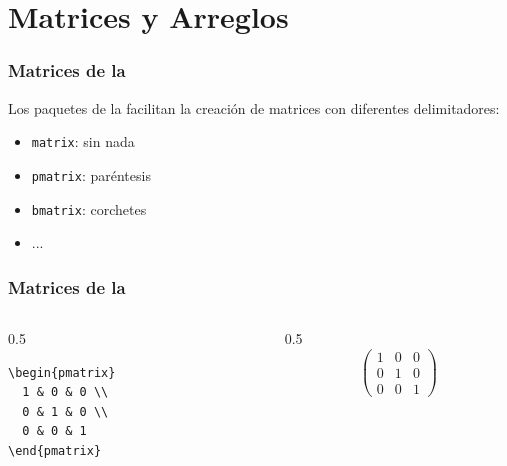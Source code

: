 \documentclass[12pt,aspectratio=169,ignorenonframetext]{ltxbeamer}
\begin{document}
\section{Matrices y Arreglos}

\begin{frame}
\frametitle{Matrices de la }

Los paquetes de la  facilitan la creación de matrices con diferentes delimitadores:
\begin{itemize}
    \item \texttt{matrix}: sin nada
    \item \texttt{pmatrix}: paréntesis
    \item \texttt{bmatrix}: corchetes
    \item ...
\end{itemize}
\end{frame}





\begin{frame}[fragile]
\frametitle{Matrices de la }

\begin{columns}
    \begin{column}{0.5\textwidth}
        \begin{verbatim}
\begin{pmatrix}
  1 & 0 & 0 \\
  0 & 1 & 0 \\
  0 & 0 & 1
\end{pmatrix}
        \end{verbatim}
    \end{column}

    \begin{column}{0.5\textwidth}
        \begin{displaymath}
            \begin{pmatrix}
                1 & 0 & 0 \\
                0 & 1 & 0 \\
                0 & 0 & 1
            \end{pmatrix}
        \end{displaymath}
    \end{column}
\end{columns}
\end{frame}
\end{document}
